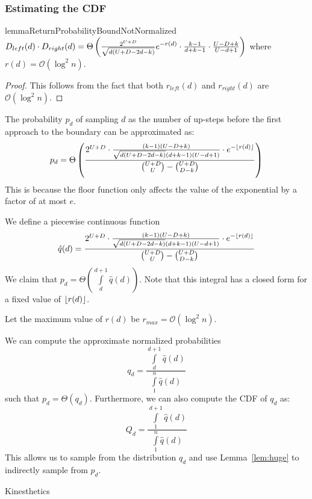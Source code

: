 \subsubsection{Estimating the CDF}%
\label{sec:estimating_the_cdf}

\begin{restatable}{lemma}{ReturnProbabilityBoundNotNormalized}
\label{lem:ReturnProbabilityBoundNotNormalized}
$D_{left}(d)\cdot D_{right}(d)
= \Theta\left( \frac{2^{U+D}}{\sqrt{d(U+D-2d-k)}}\mathlarger e^{-r(d)}\cdot\frac{k-1}{d+k-1}\cdot\frac{U-D+k}{U-d+1}\right)$
where $r(d)=\mathcal O(\log^2 n)$.
\end{restatable}
\begin{proof}
This follows from the fact that both $r_{left}(d)$ and $r_{right}(d)$ are $\mathcal O(\log^2 n)$.
\end{proof}

\begin{corollary}
\label{cor:ReturnProbabilityRounding}
The probability $p_d$ of sampling $d$ as the number of up-steps
before the first approach to the boundary can be approximated as:
\[
p_d = \Theta\left( \frac{ 2^{U+D}\cdot\frac{(k-1)(U-D+k)}{\sqrt{d(U+D-2d-k)}(d+k-1)(U-d+1)}\cdot
\mathlarger e^{-\floor{r(d)}} }{\binom{U+D}{U}-\binom{U+D}{D-k}} \right)
\]
This is because the floor function only affects the value of the exponential by a factor of at most $e$.
\end{corollary}
\begin{corollary}
\label{cor:ReturnProbabilityPiecewiseContinuous}
We define a piecewise continuous function
\[
\hat q(d) = \frac{ 2^{U+D}\cdot\frac{(k-1)(U-D+k)}{\sqrt{d(U+D-2d-k)}(d+k-1)(U-d+1)}\cdot
\mathlarger e^{-\floor{r(d)}} }{\binom{U+D}{U}-\binom{U+D}{D-k}}
\]
We claim that $p_d = \Theta\left( \int\limits_d^{d+1} \hat q(d)\right)$.
Note that this integral has a closed form for a fixed value of $\lfloor r(d)\rfloor$.
\end{corollary}


Let the maximum value of $r(d)$ be $r_{max} = \mathcal O(\log^2 n)$.
\begin{corollary}
\label{cor:}
We can compute the approximate normalized probabilities
\[
q_d = \frac{\int\limits_d^{d+1} \hat q(d)}{\int\limits_1^{n} \hat q(d)}
\]
such that $p_d = \Theta(q_d)$.
Furthermore, we can also compute the CDF of $q_d$ as:
\[
Q_d = \frac{\int\limits_1^{d+1} \hat q(d)}{\int\limits_1^{n} \hat q(d)}
\]
This allows us to sample from the distribution $q_d$ and use Lemma~\ref{lem:huge} to indirectly sample from $p_d$.
\end{corollary}
\begin{theorem}
\label{thm:first_return_in_interval}
Kinesthetics
\end{theorem}



